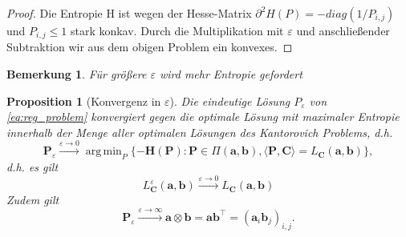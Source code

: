 \documentclass[11pt,a4paper]{article}
\DeclareMathOperator*{\argmin}{arg\,min}
\newtheorem{proposition}[theorem]{Proposition}
\newtheorem{remark}[theorem]{Bemerkung}
\numberwithin{equation}{section}
\begin{document}
	\begin{proof}
		Die Entropie H ist wegen der Hesse-Matrix $\partial ^2 H (P) = -diag(1/P_{i,j})$ und $P_{i,j} \leq 1$ stark konkav.
		Durch die Multiplikation mit $\varepsilon$ und anschließender Subtraktion wir aus dem obigen Problem ein konvexes. 
	\end{proof}

	\begin{remark}
		Für größere $\varepsilon$ wird mehr Entropie gefordert
	\end{remark}
	
	\begin{proposition}[Konvergenz in $\varepsilon$]
		Die eindeutige Lösung $P_\varepsilon$ von \autoref{eq:reg_problem} konvergiert gegen die optimale Lösung mit maximaler Entropie innerhalb der Menge aller optimalen Lösungen des Kantorovich Problems, d.h.
		\begin{equation}
		\boldsymbol{P}_\varepsilon \xrightarrow{\varepsilon \to 0} \argmin_{P} \lbrace -\boldsymbol{H}(\boldsymbol{P}) : \boldsymbol{P} \in \Pi (\boldsymbol{a}, \boldsymbol{b}), \langle \boldsymbol{P}, \boldsymbol{C} \rangle = L_{\boldsymbol{C}}(\boldsymbol{a}, \boldsymbol{b}) \rbrace, \label{eq:P_eps_0} 
		\end{equation}
		d.h. es gilt
		\begin{equation}
		L_{\boldsymbol{C}}^\varepsilon (\boldsymbol{a}, \boldsymbol{b}) \xrightarrow{\varepsilon \to 0} L_{\boldsymbol{C}}(\boldsymbol{a}, \boldsymbol{b})
		\end{equation}
		Zudem gilt
		\begin{equation}
		\boldsymbol{P}_\varepsilon \xrightarrow{\varepsilon \to \infty} \boldsymbol{a} \otimes \boldsymbol{b} = \boldsymbol{a} \boldsymbol{b}^\top = (\boldsymbol{a}_i \boldsymbol{b}_j)_{i,j}. \label{eq:P_eps_infty}
		\end{equation}
	\end{proposition}
	
\end{document}
